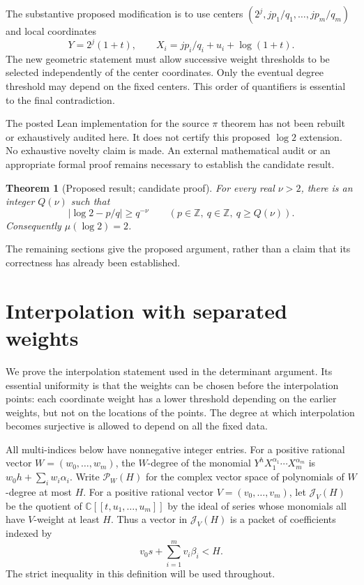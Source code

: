 \documentclass[11pt]{article}
\newcommand{\CC}{\mathbb C}
\newcommand{\ZZ}{\mathbb Z}
\newtheorem{theorem}{Theorem}[section]
\theoremstyle{definition}
\theoremstyle{remark}
\numberwithin{equation}{section}
\begin{document}
The substantive proposed modification is to use centers
$(2^j,jp_1/q_1,\ldots,jp_m/q_m)$ and local coordinates
\[
Y=2^j(1+t),\qquad
X_i=jp_i/q_i+u_i+\log(1+t).
\]
The new geometric statement must allow successive weight thresholds to
be selected independently of the center coordinates. Only the eventual
degree threshold may depend on the fixed centers. This order of
quantifiers is essential to the final contradiction.

The posted Lean implementation for the source $\pi$ theorem has not been
rebuilt or exhaustively audited here. It does not certify this proposed
$\log2$ extension. No exhaustive novelty claim is made. An external
mathematical audit or an appropriate formal proof remains necessary to
establish the candidate result.

\begin{theorem}[Proposed result; candidate proof]
\label{thm:main}
For every real $\nu>2$, there is an integer $Q(\nu)$ such that
\[
|\log2-p/q|\ge q^{-\nu}
\qquad(p\in\ZZ,\ q\in\ZZ,\ q\ge Q(\nu)).
\]
Consequently $\mu(\log2)=2$.
\end{theorem}
The remaining sections give the proposed argument, rather than a claim
that its correctness has already been established.

\section{Interpolation with separated weights}
\label{geom:section}

We prove the interpolation statement used in the determinant argument. Its
essential uniformity is that the weights can be chosen before the interpolation
points: each coordinate weight has a lower threshold depending on the earlier
weights, but not on the locations of the points. The degree at which
interpolation becomes surjective is allowed to depend on all the fixed data.

All multi-indices below have nonnegative integer entries. For a positive
rational vector $W=(w_0,\ldots,w_m)$, the $W$-degree of the
monomial $Y^hX_1^{\alpha_1}\cdots X_m^{\alpha_m}$ is
$w_0h+\sum_iw_i\alpha_i$. Write $\mathcal P_W(H)$ for the complex vector
space of polynomials of $W$-degree at most $H$. For a positive rational vector
$V=(v_0,\ldots,v_m)$, let $\mathcal J_V(H)$ be the quotient of
$\CC[[t,u_1,\ldots,u_m]]$ by the ideal of series whose monomials all have
$V$-weight at least $H$. Thus a vector in $\mathcal J_V(H)$ is a packet of
coefficients indexed by
\[
 v_0s+\sum_{i=1}^m v_i\beta_i<H.
\]
The strict inequality in this definition will be used throughout.
\end{document}
